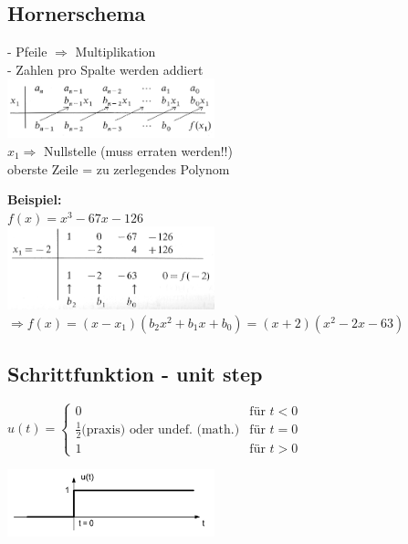 \subsection{Hornerschema}
	\begin{minipage}[t]{9cm}
		- Pfeile $\Rightarrow$ Multiplikation\\
		- Zahlen pro Spalte werden addiert\\
		\includegraphics[width=6cm]{./bilder/hornerschema_1.png}\\
		$x_1 \Rightarrow$ Nullstelle (muss erraten werden!!)\\
		oberste Zeile = zu zerlegendes Polynom			
	\end{minipage}
	\begin{minipage}[t]{9cm}
		\textbf{Beispiel:}\\
		$f(x) = x^3-67x-126$\\
		\includegraphics[width=6cm]{./bilder/hornerschema_2.png}\\
		$\Rightarrow f(x) = (x-x_1)(b_2x^2 + b_1x + b_0) = (x+2)(x^2-2x-63)$	
	\end{minipage}

\subsection{Schrittfunktion - unit step}
	\begin{minipage}{10cm}
		$u(t) =	\begin{cases}
		  		 0 & \text{für } t < 0 \\
		  		 \frac{1}{2} \text{(praxis)}  \text{ oder undef. (math.)} & \text{für } t = 0 \\
		  		 1 & \text{für } t > 0
		  	\end{cases}
		$
	\end{minipage}
	\begin{minipage}{8cm}
		\includegraphics[width=6cm]{./bilder/unitstep.png}
	\end{minipage}


